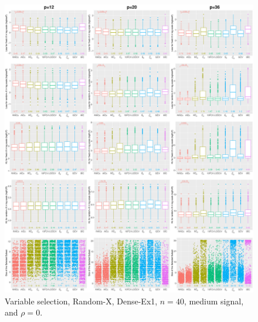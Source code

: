 \begin{figure}[!ht]
\centering
\includegraphics[width=\textwidth]{figures/supplement/randomx/subset_selection/Dense-Ex1_n40_msnr_rho0.eps}
\caption{Variable selection, Random-X, Dense-Ex1, $n=40$, medium signal, and $\rho=0$.}
\end{figure}
\clearpage
